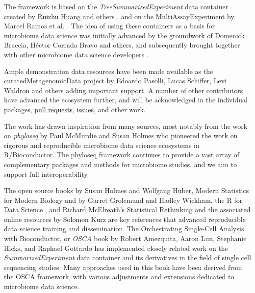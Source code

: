 \documentclass[
]{book}
\begin{document}
The framework is based on the \emph{TreeSummarizedExperiment} data
container created by Ruizhu Huang and others
\citep{R-TreeSummarizedExperiment}, and on the MultiAssayExperiment by
Marcel Ramos et al. \citep{Ramos2017}. The idea of using these containers
as a basis for microbiome data science was initially advanced by the
groundwork of Domenick Braccia, Héctor Corrada Bravo and others, and
subsequently brought together with other microbiome data science
developers \citep{Shetty2019}.

Ample demonstration data resources have been made available as the
\href{https://waldronlab.io/curatedMetagenomicData/}{curatedMetagenomicData}
project by Edoardo Pasolli, Lucas Schiffer, Levi Waldron and others
\citep{Pasolli2017} adding important support.
A number of other contributors have advanced the ecosystem
further, and will be acknowledged in the individual
packages, \href{https://github.com/microbiome/OMA/graphs/contributors}{pull
requests},
\href{https://github.com/microbiome/OMA/issues}{issues}, and other work.

The work has drawn inspiration from many sources, most notably from
the work on \emph{phyloseq} by Paul McMurdie and Susan Holmes
\citep{McMurdie2013} who pioneered the work on rigorous and reproducible
microbiome data science ecosystems in R/Bioconductor. The phyloseq
framework continues to provide a vast array of complementary packages
and methods for microbiome studies, and we aim to support full
interoperability.

The open source books by Susan Holmes and Wolfgang Huber, Modern
Statistics for Modern Biology \citep{Holmes2019} and by Garret Grolemund
and Hadley Wickham, the R for Data Science \citep{Grolemund2017}, and
Richard McElreath's Statistical Rethinking and the associated online
resources by Solomon Kurz \citep{McElreath2020} are key references that
advanced reproducible data science training and dissemination. The
Orchestrating Single-Cell Analysis with Bioconductor, or \emph{OSCA} book
by Robert Amezquita, Aaron Lun, Stephanie Hicks, and Raphael Gottardo
\citep{Amezquita2020natmeth} has implemented closely related work on the
\emph{SummarizedExperiment} data container and its derivatives in the field
of single cell sequencing studies. Many approaches used in this book
have been derived from the \href{https://bioconductor.org/books/release/OSCA/}{OSCA
framework}, with various
adjustments and extensions dedicated to microbiome data science.

  
\end{document}
